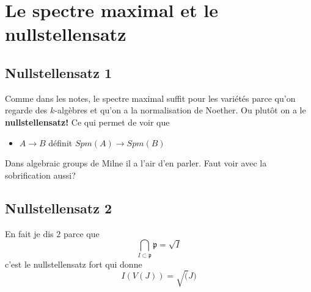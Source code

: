 \documentclass[a4paper,12pt]{book}
\newcommand{\p}{\mathfrak{p}}
\theoremstyle{plain}
\theoremstyle{definition}
\theoremstyle{remark}
\begin{document}
\chapter{Le spectre maximal et le nullstellensatz}
\section{Nullstellensatz 1}
Comme dans les notes, le spectre maximal suffit pour 
les variétés parce qu'on regarde des $k$-algèbres et
qu'on a la normalisation de Noether. Ou plutôt on a le 
\textbf{nullstellensatz!} Ce qui permet de voir que 
\begin{itemize}
    \item $A\to B$ définit $Spm(A)\to Spm(B)$
\end{itemize}
Dans algebraic groups de Milne il a l'air d'en parler. Faut voir
avec la sobrification aussi?
\section{Nullstellensatz 2}
En fait je dis $2$ parce que 
\[\bigcap_{I\subset \p} \p =\sqrt{I}\]
c'est le nullstellensatz fort qui donne 
\[I(V(J))=\sqrt(J)\]

\printbibliography
\end{document}
